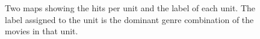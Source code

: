 \documentclass[conference]{IEEEtran}
\begin{document}
\begin{center}
\begin{figure}
\centering
{}
\caption{Two maps showing the hits per unit and the label of each unit. The label assigned to the unit is the dominant genre combination of the movies in that unit.}
\label{fig1}
\end{figure}    

\end{center}
\end{document}

